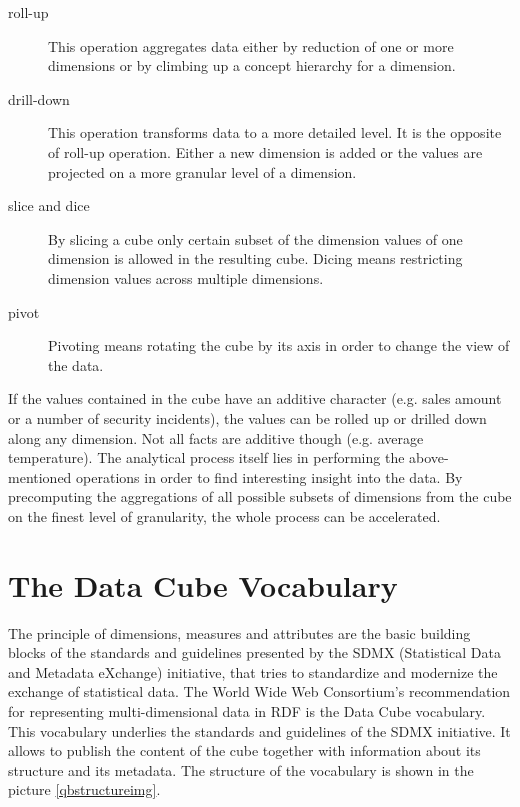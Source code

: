 \begin{description}
    \item[roll-up] This operation aggregates data either by reduction of one or more dimensions or by climbing up a concept hierarchy for a dimension.
    \item[drill-down] This operation transforms data to a more detailed level. It is the opposite of roll-up operation. Either a new dimension is added or the values are projected on a more granular level of a dimension.
    \item[slice and dice] By slicing a cube only certain subset of the dimension values of one dimension is allowed in the resulting cube. Dicing means restricting dimension values across multiple dimensions.
    \item[pivot] Pivoting means rotating the cube by its axis in order to change the view of the data.
\end{description}

If the values contained in the cube have an additive character (e.g. sales amount or a number of security incidents), the values can be rolled up or drilled down along any dimension. Not all facts are additive though (e.g. average temperature). The analytical process itself lies in performing the above-mentioned operations in order to find interesting insight into the data. By precomputing the aggregations of all possible subsets of dimensions from the cube on the finest level of granularity, the whole process can be accelerated.

\section{The Data Cube Vocabulary\label{dcv}}

The principle of dimensions, measures and attributes are the basic building blocks of the standards and guidelines presented by the SDMX (Statistical Data and Metadata eXchange) initiative, that tries to standardize and modernize the exchange of statistical data. The World Wide Web Consortium's recommendation for representing multi-dimensional data in RDF is the Data Cube vocabulary.\cite{dcv2014} This vocabulary underlies the standards and guidelines of the SDMX initiative. It allows to publish the content of the cube together with information about its structure and its metadata. The structure of the vocabulary is shown in the picture \ref{qbstructureimg}.

